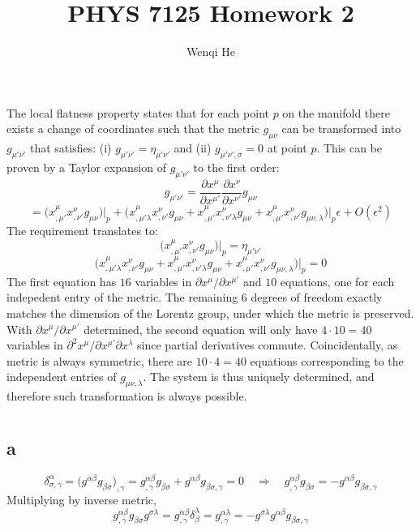 \documentclass{article}
\title{PHYS 7125 Homework 2}
\author{Wenqi He}
\begin{document}
\maketitle
\section{}
The local flatness property states that for each point $p$ on the manifold there exists a change of coordinates such that the metric $g_{\mu\nu}$ can be transformed into $g_{\mu'\nu'}$ that satisfies: (i) $g_{\mu'\nu'} = \eta_{\mu'\nu'}$ and (ii) $g_{\mu'\nu',\sigma} = 0$ at point $p$. This can be proven by a Taylor expansion of $g_{\mu'\nu'}$ to the first order:
\[ g_{\mu'\nu'} = \frac{\partial x^\mu}{\partial x^{\mu'}}\frac{\partial x^\nu}{\partial x^{\nu'}} g_{\mu\nu} \]
\[ = \Big(x^\mu_{,\mu'} x^\nu_{,\nu'} g_{\mu\nu}\Big)\Big\rvert_p
	+ \Bigg( x^\mu_{,\mu'\lambda} x^\nu_{,\nu'} g_{\mu\nu}
	+ x^\mu_{,\mu'}x^\nu_{,\nu'\lambda}g_{\mu\nu}
	+ x^\mu_{,\mu'}x^\nu_{,\nu'} g_{\mu\nu,\lambda}\Bigg)\Big\rvert_p \epsilon + O(\epsilon^2) \]
The requirement translates to: 
\[ \Big(x^\mu_{,\mu'} x^\nu_{,\nu'} g_{\mu\nu}\Big)\Big\rvert_p = \eta_{\mu'\nu'} \]
\[ \Bigg( x^\mu_{,\mu'\lambda} x^\nu_{,\nu'} g_{\mu\nu}
	+ x^\mu_{,\mu'}x^\nu_{,\nu'\lambda}g_{\mu\nu}
	+ x^\mu_{,\mu'}x^\nu_{,\nu'} g_{\mu\nu,\lambda}\Bigg)\Big\rvert_p = 0 \]
The first equation has $16$ variables in $\partial x^\mu/\partial x^{\mu'}$ and $10$ equations, one for each indepedent entry of the metric. The remaining 6 degrees of freedom exactly matches the dimension of the Lorentz group, under which the metric is preserved. With $\partial x^\mu/\partial x^{\mu'}$ determined, the second equation will only have $4 \cdot 10 = 40$ variables in $\partial^2x^\mu/\partial x^{\mu'}\partial x^\lambda$ since partial derivatives commute. Coincidentally, as metric is always symmetric, there are $10 \cdot 4 = 40$ equations corresponding to the independent entries of $g_{\mu\nu,\lambda}$. The system is thus uniquely determined, and therefore such transformation is always possible.

\section{}
\subsection*{a}
\[
\delta^\alpha_{\sigma,\gamma} = \Big(g^{\alpha\beta}g_{\beta\sigma}\Big)_{,\gamma} = g^{\alpha\beta}_{,\gamma}g_{\beta\sigma} + g^{\alpha\beta}g_{\beta\sigma,\gamma} = 0
\quad\Rightarrow\quad g^{\alpha\beta}_{,\gamma}g_{\beta\sigma} = - g^{\alpha\beta}g_{\beta\sigma,\gamma}\]
Multiplying by inverse metric,
\[
g^{\alpha\beta}_{,\gamma}g_{\beta\sigma}g^{\sigma\lambda}
= g^{\alpha\beta}_{,\gamma} \delta^\lambda_\beta
= g^{\alpha\lambda}_{,\gamma} = - g^{\sigma\lambda}g^{\alpha\beta}g_{\beta\sigma,\gamma}
\]
\end{document}
